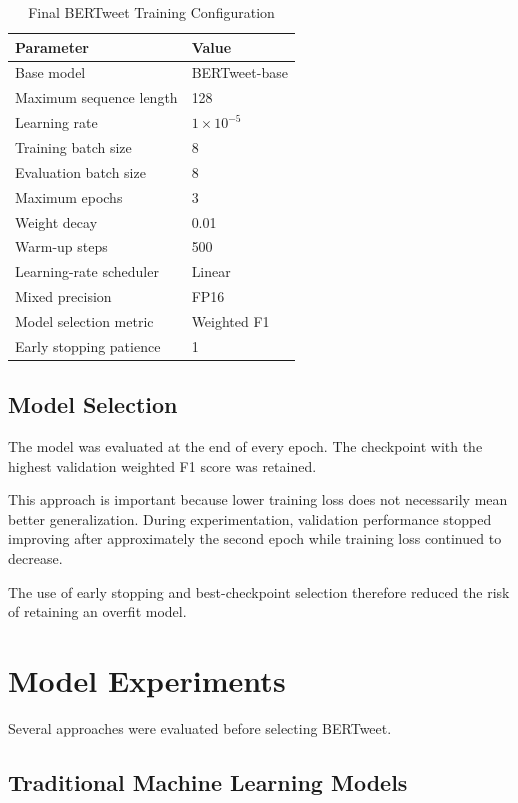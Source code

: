 \documentclass[12pt,a4paper]{article}
\begin{document}
\begin{table}[H]
\centering
\caption{Final BERTweet Training Configuration}
\begin{tabular}{ll}
\toprule
\textbf{Parameter} & \textbf{Value} \\
\midrule
Base model & BERTweet-base \\
Maximum sequence length & 128 \\
Learning rate & $1\times10^{-5}$ \\
Training batch size & 8 \\
Evaluation batch size & 8 \\
Maximum epochs & 3 \\
Weight decay & 0.01 \\
Warm-up steps & 500 \\
Learning-rate scheduler & Linear \\
Mixed precision & FP16 \\
Model selection metric & Weighted F1 \\
Early stopping patience & 1 \\
\bottomrule
\end{tabular}
\end{table}

\subsection{Model Selection}

The model was evaluated at the end of every epoch. The checkpoint with the
highest validation weighted F1 score was retained.

This approach is important because lower training loss does not necessarily
mean better generalization. During experimentation, validation performance
stopped improving after approximately the second epoch while training loss
continued to decrease.

The use of early stopping and best-checkpoint selection therefore reduced the
risk of retaining an overfit model.

\section{Model Experiments}

Several approaches were evaluated before selecting BERTweet.

\subsection{Traditional Machine Learning Models}
\end{document}

